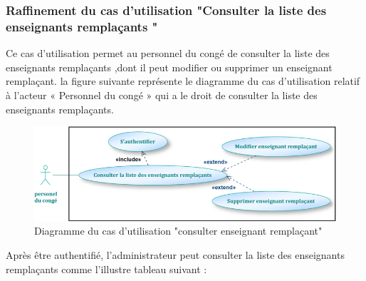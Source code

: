 \documentclass[12 pt]{report}
\begin{document}
\subsubsection{Raffinement du cas d'utilisation "Consulter la liste des enseignants remplaçants "}
Ce cas d'utilisation permet au personnel du congé de consulter la liste des enseignants remplaçants ,dont il peut modifier ou supprimer un enseignant remplaçant.
la figure suivante représente le diagramme du cas d’utilisation  relatif à l’acteur « Personnel du congé » qui a le droit de consulter la liste des enseignants remplaçants.
\begin{figure}[h]
 \begin{center}
\includegraphics[width=13 cm ,height=5 cm]{con_ens_remp.PNG}
\caption{Diagramme du cas d’utilisation "consulter enseignant remplaçant"}
\end{center}
\end{figure}
Après être authentifié, l'administrateur peut consulter la  liste des enseignants remplaçants comme l'illustre  tableau suivant : 
\end{document}
